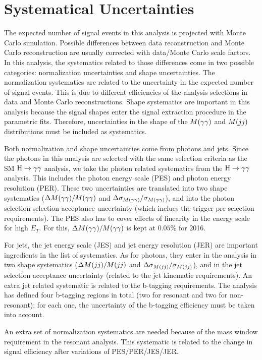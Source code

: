 \section{Systematical Uncertainties}
\label{sec:systematics}

The expected number of signal events in this analysis is projected with Monte Carlo simulation.
Possible differences between data reconstruction and Monte Carlo reconstruction are usually corrected with data/Monte Carlo scale factors.
In this analysis, the systematics related to those differences come in two possible categories: normalization uncertainties and shape uncertainties.
The normalization systematics are related to the uncertainty in the expected number of signal events. This is due to different efficiencies of the analysis selections in data and Monte Carlo reconstructions.
Shape systematics are important in this analysis because the signal shapes enter the signal extraction procedure in the parametric fits. Therefore, uncertainties in the shape of the $M(\gamma\gamma)$ and $M(jj)$ distributions must be included as systematics.

Both normalization and shape uncertainties come from photons and jets.
Since the photons in this analysis are selected with the same selection criteria as the SM $\mathrm{H}\to\gamma\gamma$ analysis, we take the photon related systematics from the $\mathrm{H}\to\gamma\gamma$ analysis.
This includes the photon energy scale (PES) and photon energy resolution (PER).
These two uncertainties are translated into two shape systematics ($\Delta M(\gamma\gamma)/M(\gamma\gamma)$ and $\Delta \sigma_{M(\gamma\gamma)}/\sigma_{M(\gamma\gamma)}$), and into the photon selection selection acceptance uncertainty (which inclues the trigger pre-selection requirements).
The PES also has to cover effects of linearity in the energy scale for high $E_{T}$. For this, $\Delta M(\gamma\gamma)/M(\gamma\gamma)$ is kept at  $0.05\%$ for 2016.

For jets, the jet energy scale (JES) and jet energy resolution (JER) are important ingredients in the list of systematics.
As for photons, they enter in the analysis in two shape systematics ($\Delta M(jj)/M(jj)$ and $\Delta \sigma_{M(jj)}/\sigma_{M(jj)}$), and in the jet selection acceptance uncertainty (related to the jet kinematic requirements).
An extra jet related systematic is related to the b-tagging requirements. The analysis has defined four b-tagging regions in total (two for resonant and two for non-resonant); for each one, the uncertainty of the b-tagging efficiency must be taken into account.

An extra set of normalization systematics are needed because of the mass window requirement in the resonant analysis.
This systematic is related to the change in signal efficiency after variations of PES/PER/JES/JER.


